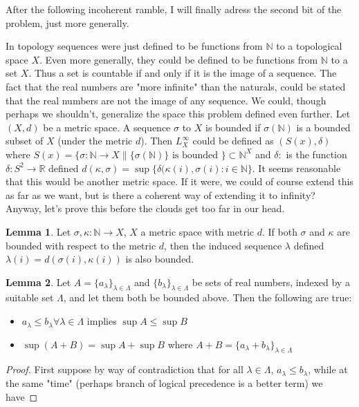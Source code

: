 \documentclass[11pt]{article}
\newcommand{\R}{\mathbb{R}}
\newcommand{\N}{\mathbb{N}}
\theoremstyle{definition}
\newtheorem{lemma}{Lemma}
\begin{document}
After the following incoherent ramble, I will finally adress the second bit of the problem, just more generally.

In topology sequences were just defined to be functions from $\N$ to a topological space $X$. Even more generally, they could be defined to be functions from $\N$ to a set $X$. Thus a set is countable if and only if it is the image of a sequence. The fact that the real numbers are "more infinite" than the naturals, could be stated that the real numbers are not the image of any sequence. We could, though perhaps we shouldn't, generalize the space this problem defined even further. Let $(X,d)$ be a metric space. A sequence $\sigma$ to $X$ is bounded if $\sigma(\N)$ is a bounded subset of $X$ (under the metric $d$). Then $L_X^\infty$ could be defined as $(S(x),\delta)$ where $S(x) = \{\sigma:\N\to X\|\{\sigma(\N)\}\mbox{ is bounded }\}\subset \N^X$ and $\delta:$ is the function $\delta:S^2\to \R$ defined $d(\kappa,\sigma) = \sup\{\delta(\kappa(i), \sigma(i): i\in \N\}$. It seems reasonable that this would be another metric space. If it were, we could of course extend this as far as we want, but is there a coherent way of extending it to infinity? Anyway, let's prove this before the clouds get too far in our head. 

\begin{lemma}
Let $\sigma,\kappa:\N\to X$, $X$ a metric space with metric $d$. If both $\sigma $ and $\kappa$ are bounded with respect to the metric $d$, then the induced sequence $\lambda$ defined $\lambda(i) = d(\sigma(i), \kappa(i))$ is also bounded.
\end{lemma}

\begin{lemma}
Let $A = \{a_\lambda\}_{\lambda \in\Lambda}$ and $\{b_\lambda\}_{\lambda\in \Lambda}$ be sets of real numbers, indexed by a suitable set $\Lambda$, and let them both be bounded above. Then the following are true: 
\begin{itemize}
\item $a_\lambda\le b_\lambda \forall \lambda\in \Lambda$ implies $\sup A \le \sup B$
\item $ \sup(A+ B) = \sup A + \sup B $ where $A + B = \{a_\lambda + b_\lambda\}_{\lambda\in \Lambda}$
\end{itemize}

\end{lemma}

\begin{proof}

First suppose by way of contradiction that for all $\lambda\in \Lambda$, $a_\lambda \le b_\lambda$, while at the same "time" (perhaps branch of logical precedence is a better term) we have 
\end{proof}
\end{document}

